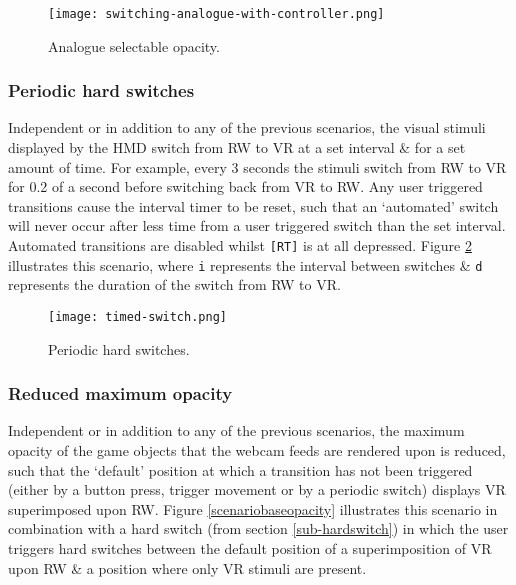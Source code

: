 \begin{figure}[h]
	\begin{center}
		\texttt{[image: switching-analogue-with-controller.png]}
		\caption{Analogue selectable opacity.}
		\label{scenario2}
	\end{center}
\end{figure}


\subsubsection{Periodic hard switches}
\label{subsub-periodic}
Independent or in addition to any of the previous scenarios, the visual stimuli displayed by the HMD switch from RW to VR at a set interval \& for a set amount of time. For example, every 3 seconds the stimuli switch from RW to VR for 0.2 of a second before switching back from VR to RW. Any user triggered transitions cause the interval timer to be reset, such that an `automated' switch will never occur after less time from a user triggered switch than the set interval. Automated transitions are disabled whilst \texttt{[RT]} is at all depressed. Figure \ref{scenariotimed} illustrates this scenario, where \texttt{i} represents the interval between switches \& \texttt{d} represents the duration of the switch from RW to VR.

\begin{figure}[h]
	\begin{center}
		\texttt{[image: timed-switch.png]}
		\caption{Periodic hard switches.}
		\label{scenariotimed}
	\end{center}
\end{figure}


\subsubsection{Reduced maximum opacity}
\label{subsub-baseopacity}
Independent or in addition to any of the previous scenarios, the maximum opacity of the game objects that the webcam feeds are rendered upon is reduced, such that the `default' position at which a transition has not been triggered (either by a button press, trigger movement or by a periodic switch) displays VR superimposed upon RW. Figure \ref{scenariobaseopacity} illustrates this scenario in combination with a hard switch (from section \ref{sub-hardswitch}) in which the user triggers hard switches between the default position of a superimposition of VR upon RW \& a position where only VR stimuli are present.

